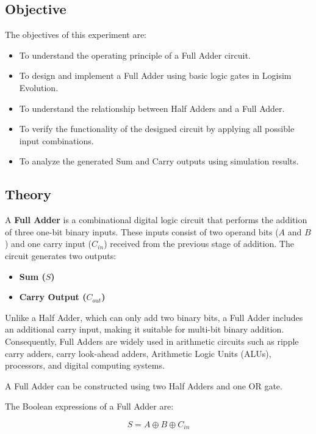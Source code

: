 \documentclass[12pt,a4paper]{article}
\begin{document}
\subsection{Objective}

The objectives of this experiment are:

\begin{itemize}
    \item To understand the operating principle of a Full Adder circuit.
    \item To design and implement a Full Adder using basic logic gates in Logisim Evolution.
    \item To understand the relationship between Half Adders and a Full Adder.
    \item To verify the functionality of the designed circuit by applying all possible input combinations.
    \item To analyze the generated Sum and Carry outputs using simulation results.
\end{itemize}

\subsection{Theory}

A \textbf{Full Adder} is a combinational digital logic circuit that performs the addition of three one-bit binary inputs. These inputs consist of two operand bits ($A$ and $B$) and one carry input ($C_{in}$) received from the previous stage of addition. The circuit generates two outputs:

\begin{itemize}
    \item \textbf{Sum ($S$)}
    \item \textbf{Carry Output ($C_{out}$)}
\end{itemize}

Unlike a Half Adder, which can only add two binary bits, a Full Adder includes an additional carry input, making it suitable for multi-bit binary addition. Consequently, Full Adders are widely used in arithmetic circuits such as ripple carry adders, carry look-ahead adders, Arithmetic Logic Units (ALUs), processors, and digital computing systems.

A Full Adder can be constructed using two Half Adders and one OR gate.

The Boolean expressions of a Full Adder are:

\begin{equation}
S=A\oplus B\oplus C_{in}
\end{equation}
\end{document}
